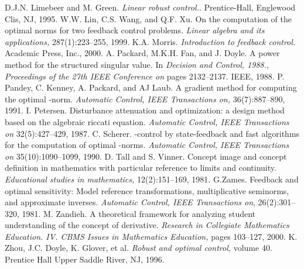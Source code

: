 \documentclass[12pt,a4paper]{article}
\theoremstyle{definition}
\newcommand{\hinf}{\text{\emph{H$_\infty$ }}}
\begin{document}
\begin{thebibliography}{99}
 D.J.N. Limebeer and M. Green. \textit{Linear robust control.}. Prentice-Hall, Englewood Clis, NJ, 1995.
 W.W. Lin, C.S. Wang, and Q.F. Xu. On the computation of the optimal \hinf norms for two feedback control problems. \textit{Linear algebra and its applications,} 287(1):223–255, 1999.
 K.A. Morris. \textit{Introduction to feedback control.} Academic Press, Inc., 2000.
 A. Packard, M.K.H. Fan, and J. Doyle. A power method for the structured singular value. In \textit{Decision and Control, 1988., Proceedings of the 27th IEEE Conference on} pages 2132–2137. IEEE, 1988.
 P. Pandey, C. Kenney, A. Packard, and AJ Laub. A gradient method for computing the optimal \hinf-norm. \textit{Automatic Control, IEEE Transactions on,} 36(7):887–890, 1991.
 I. Petersen. Disturbance attenuation and \hinf optimization: a design method based on the algebraic riccati equation. \textit{Automatic Control, IEEE Transactions on} 32(5):427–429, 1987.
 C. Scherer. \hinf-control by state-feedback and fast algorithms for the computation of optimal \hinf-norms. \textit{Automatic Control, IEEE Transactions on} 35(10):1090–1099, 1990.
 D. Tall and S. Vinner. Concept image and concept definition in mathematics with particular reference to limits and continuity. \textit{Educational studies in mathematics, } 12(2):151–169, 1981.
 G.Zames. Feedback and optimal sensitivity: Model reference transformations, multiplicative seminorms, and approximate inverses. \textit{Automatic Control, IEEE Transactions on}, 26(2):301–320, 1981.
 M. Zandieh. A theoretical framework for analyzing student understanding of the concept of derivative. \textit{Research in Collegiate Mathematics Education. IV. CBMS Issues in Mathematics Education,} pages 103–127, 2000.
 K. Zhou, J.C. Doyle, K. Glover, et al. \textit{Robust and optimal control,} volume 40. Prentice Hall Upper Saddle River, NJ, 1996.
\end{thebibliography}
\end{document}
